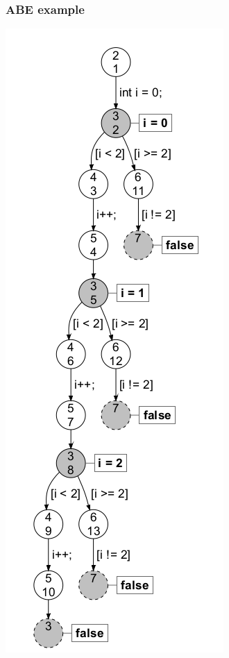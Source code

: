 \documentclass[11pt]{beamer}
\begin{document}
\begin{frame}\frametitle{ABE example}
\begin{center}
\includegraphics[scale=0.26]{a.png}
\end{center}
\end{frame}
\end{document}
